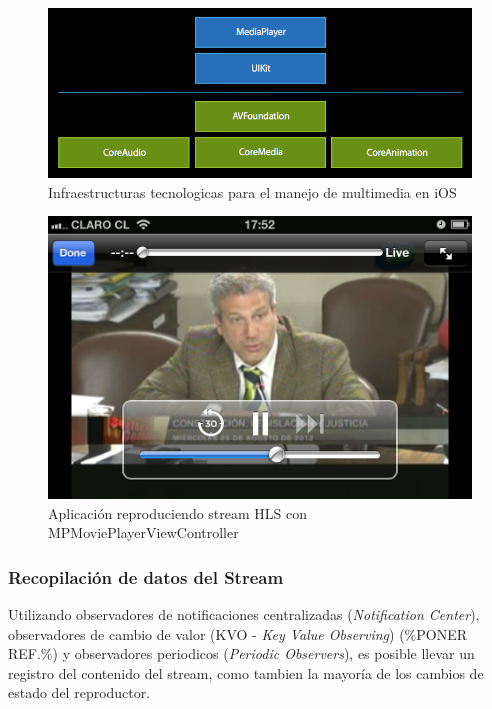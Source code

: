 \begin{figure}[H]
	\centering
	\includegraphics[scale=0.5]{imgs/ios-tech-frameworks.png}
	\caption{Infraestructuras tecnologicas para el manejo de multimedia en iOS}
	\label{IMG-ios-tech-frameworks}	
\end{figure}

\begin{figure}[H]
	\centering
	\includegraphics[scale=0.3]{imgs/mpmpvc-example.png}
	\caption{Aplicación reproduciendo stream HLS con MPMoviePlayerViewController}
	\label{IMG-mpmpvc-example}	
\end{figure}

		\subsubsection{Recopilación de datos del Stream}
Utilizando observadores de notificaciones centralizadas (\textit{Notification Center}), observadores de cambio de valor (KVO - \textit{Key Value Observing}) (\%PONER REF.\%) y observadores periodicos (\textit{Periodic Observers}), es posible llevar un registro del contenido del stream, como tambien la mayoría de los cambios de estado del reproductor.

